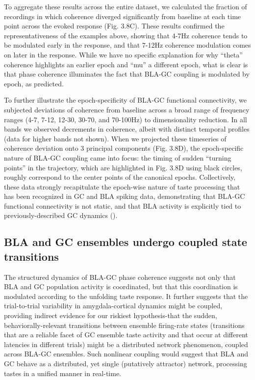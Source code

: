 \begin{refsection}
To aggregate these results across the entire dataset, we calculated the fraction of recordings in which coherence diverged significantly from baseline at each time point across the evoked response (Fig. 3.8C). These results confirmed the representativeness of the examples above, showing that 4-7Hz coherence tends to be modulated early in the response, and that 7-12Hz coherence modulation comes on later in the response. While we have no specific explanation for why “theta” coherence highlights an earlier epoch and “mu” a different epoch, what is clear is that phase coherence illuminates the fact that BLA-GC coupling is modulated by epoch, as predicted.

To further illustrate the epoch-specificity of BLA-GC functional connectivity, we subjected deviations of coherence from baseline across a broad range of frequency ranges (4-7, 7-12, 12-30, 30-70, and 70-100Hz) to dimensionality reduction. In all bands we observed decrements in coherence, albeit with distinct temporal profiles (data for higher bands not shown). When we projected these timeseries of coherence deviation onto 3 principal components (Fig. 3.8D), the epoch-specific nature of BLA-GC coupling came into focus: the timing of sudden “turning points” in the trajectory, which are highlighted in Fig. 3.8D using black circles, roughly correspond to the center points of the canonical epochs. Collectively, these data strongly recapitulate the epoch-wise nature of taste processing that has been recognized in GC and BLA spiking data, demonstrating that BLA-GC functional connectivity is not static, and that BLA activity is explicitly tied to previously-described GC dynamics (\cite{lin2021a}).

\subsection{BLA and GC ensembles undergo coupled state transitions}
The structured dynamics of BLA-GC phase coherence suggests not only that BLA and GC population activity is coordinated, but that this coordination is modulated according to the unfolding taste response. It further suggests that the trial-to-trial variability in amygdala-cortical dynamics might be coupled, providing indirect evidence for our riskiest hypothesis-that the sudden, behaviorally-relevant transitions between ensemble firing-rate states (transitions that are a reliable facet of GC ensemble taste activity and that occur at different latencies in different trials) might be a distributed network phenomenon, coupled across BLA-GC ensembles. Such nonlinear coupling would suggest that BLA and GC behave as a distributed, yet single (putatively attractor) network, processing tastes in a unified manner in real-time.


\end{refsection}

